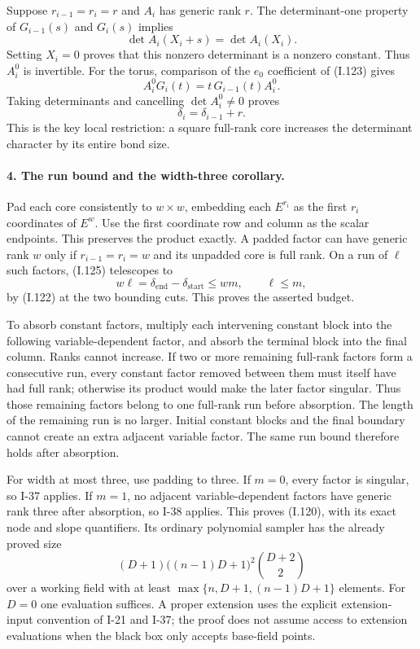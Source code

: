 Suppose $r_{i-1}=r_i=r$ and $A_i$ has generic rank $r$.
The determinant-one property of $G_{i-1}(s)$ and $G_i(s)$
implies
\[
 \det A_i(X_i+s)=\det A_i(X_i).
\]
Setting $X_i=0$ proves that this nonzero determinant is a
nonzero constant. Thus $A_i^0$ is invertible. For the torus,
comparison of the $e_0$ coefficient of (I.123) gives
\[
 A_i^0G_i(t)=t\,G_{i-1}(t)A_i^0.
\]
Taking determinants and cancelling $\det A_i^0\ne0$ proves
\[
 \delta_i=\delta_{i-1}+r.
 \tag{I.125}
\]
This is the key local restriction: a square full-rank core
increases the determinant character by its entire bond size.

\paragraph{4. The run bound and the width-three corollary.}
Pad each core consistently to $w\times w$, embedding each
$E^{r_i}$ as the first $r_i$ coordinates of $E^w$. Use the first
coordinate row and column as the scalar endpoints. This
preserves the product exactly. A padded factor can have generic
rank $w$ only if $r_{i-1}=r_i=w$ and its unpadded core is full
rank. On a run of $\ell$ such factors, (I.125) telescopes to
\[
 w\ell=\delta_{\mathrm{end}}-\delta_{\mathrm{start}}
           \le wm,
 \qquad \ell\le m,
 \tag{I.126}
\]
by (I.122) at the two bounding cuts. This proves the asserted
budget.

To absorb constant factors, multiply each intervening constant
block into the following variable-dependent factor, and absorb
the terminal block into the final column. Ranks cannot increase.
If two or more remaining full-rank factors form a consecutive
run, every constant factor removed between them must itself
have had full rank; otherwise its product would make the later
factor singular. Thus those remaining factors belong to one
full-rank run before absorption. The length of the remaining
run is no larger. Initial constant blocks and the final boundary
cannot create an extra adjacent variable factor. The same run
bound therefore holds after absorption.

For width at most three, use padding to three. If $m=0$, every
factor is singular, so I-37 applies. If $m=1$, no adjacent
variable-dependent factors have generic rank three after
absorption, so I-38 applies. This proves (I.120), with its exact
node and slope quantifiers. Its ordinary polynomial sampler
has the already proved size
\[
 (D+1)\bigl((n-1)D+1\bigr)^2\binom{D+2}{2}
 \tag{I.127}
\]
over a working field with at least
$\max\{n,D+1,(n-1)D+1\}$ elements. For $D=0$ one evaluation
suffices. A proper extension uses the explicit extension-input
convention of I-21 and I-37; the proof does not assume access to
extension evaluations when the black box only accepts base-field
points.

